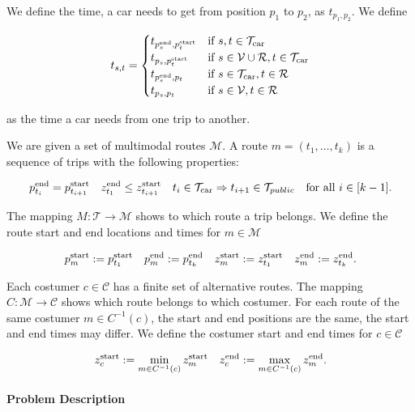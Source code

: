 We define the time, a car needs to get from position $p_1$ to $p_2$, as $t_{p_1,p_2}$. We define

\begin{equation*}
	t_{s,t} = 
	\begin{cases}
		t_{p^{\operatorname{end}}_s,p^{\operatorname{start}}_t} & \text{if } s,t\in\mathcal{T}_{\operatorname{car}} \\
		t_{p_s,p^{\operatorname{start}}_t} & \text{if } s\in\mathcal{V}\cup\mathcal{R}, t\in\mathcal{T}_{\operatorname{car}} \\
		t_{p^{\operatorname{end}}_s,p_t} & \text{if } s\in\mathcal{T}_{\operatorname{car}}, t\in\mathcal{R} \\
		t_{p_s,p_t} & \text{if } s\in\mathcal{V},t\in\mathcal{R}
	\end{cases}
\end{equation*}

as the time a car needs from one trip to another.

We are given a set of multimodal routes $\mathcal{M}$. A route $m=\left(t_1,\dots,t_k\right)$ is a sequence of trips with the following properties:

\begin{align*}
	p^{\operatorname{end}}_{t_i} = p^{\operatorname{start}}_{t_{i+1}} & & z^{\operatorname{end}}_{t_1} \leq z^{\operatorname{start}}_{t_{i+1}} & & t_i\in\mathcal{T}_{\operatorname{car}}\Rightarrow t_{i+1}\in\mathcal{T}_{public} & & \text{for all } i\in[k-1].
\end{align*}

The mapping $M:\mathcal{T}\to\mathcal{M}$ shows to which route a trip belongs. We define the route start and end locations and times for $m\in\mathcal{M}$

\begin{align*}
	p^{\operatorname{start}}_m := p^{\operatorname{start}}_{t_1} & &  p^{\operatorname{end}}_m := p^{\operatorname{end}}_{t_k} & & z^{\operatorname{start}}_m := z^{\operatorname{start}}_{t_1} & & z^{\operatorname{end}}_m := z^{\operatorname{end}}_{t_k}.
\end{align*}

Each costumer $c\in\mathcal{C}$ has a finite set of alternative routes. The mapping $C:\mathcal{M}\to\mathcal{C}$ shows which route belongs to which costumer. For each route of the same costumer $m\in C^{-1}(c)$, the start and end positions are the same, the start and end times may differ. We define the costumer start and end times for $c\in\mathcal{C}$

\begin{align}
	z^{\operatorname{start}}_c := \min_{m\in C^{-1}(c)}z^{\operatorname{start}}_m & & z^{\operatorname{end}}_c := \max_{m\in C^{-1}(c)}z^{\operatorname{end}}_m . \label{eq:costumer_time}
\end{align}

\paragraph{Problem Description} \parfill

